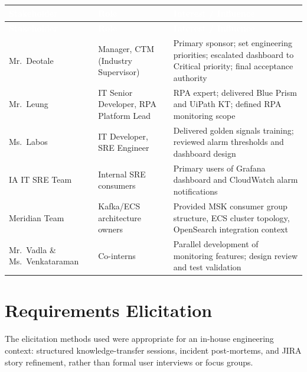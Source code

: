 \begin{tabularx}{\textwidth}{@{\hspace{\tabcolsep}}>{\raggedright\arraybackslash}p{}>{\raggedright\arraybackslash}p{}>{\raggedright\arraybackslash}X@{\hspace{\tabcolsep}}}
\caption{Stakeholder Identification} \label{tab:stakeholders} \\
\hline
\rowcolor{smubrand}\textcolor{white}{\textbf{Stakeholder}} & \textcolor{white}{\textbf{Role}} & \textcolor{white}{\textbf{Interest / Influence}} \\
\hline
\endfirsthead
\hline
\rowcolor{smubrand}\textcolor{white}{\textbf{Stakeholder}} & \textcolor{white}{\textbf{Role}} & \textcolor{white}{\textbf{Interest / Influence}} \\
\hline
\endhead
\hline
\endfoot
\rowcolor{tablerowA} Mr.\ Deotale & Manager, CTM (Industry Supervisor) & Primary sponsor; set engineering priorities; escalated dashboard to Critical priority; final acceptance authority \\
\rowcolor{tablerowB} Mr.\ Leung & IT Senior Developer, RPA Platform Lead & RPA expert; delivered Blue Prism and UiPath KT; defined RPA monitoring scope \\
\rowcolor{tablerowA} Ms.\ Labos & IT Developer, SRE Engineer & Delivered golden signals training; reviewed alarm thresholds and dashboard design \\
\rowcolor{tablerowB} IA IT SRE Team & Internal SRE consumers & Primary users of Grafana dashboard and CloudWatch alarm notifications \\
\rowcolor{tablerowA} Meridian Team & Kafka/ECS architecture owners & Provided MSK consumer group structure, ECS cluster topology, OpenSearch integration context \\
\rowcolor{tablerowB} Mr.\ Vadla \& Ms.\ Venkataraman & Co-interns & Parallel development of monitoring features; design review and test validation \\
\hline
\end{tabularx}


\FloatBarrier

\section{Requirements Elicitation}
\label{sec:requirements_elicitation}


The elicitation methods used were appropriate for an
in-house engineering context: structured knowledge-transfer sessions,
incident post-mortems, and JIRA story refinement, rather than formal
user interviews or focus groups.

